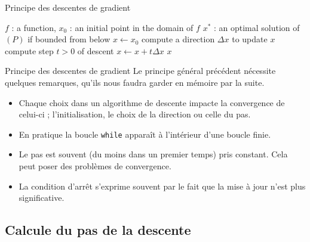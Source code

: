 \documentclass[aspectratio = 169]{beamer}
\begin{document}
\begin{frame}{Principe des descentes de gradient}
  \begin{algorithm}[H]
    \caption{Principe des descentes de gradient}
    \small{
      \begin{algorithmic}[1]
        \Statex
        \Require $f$ : a function,  $x_0$ : an initial point in the domain of $f$
        \Ensure $x^*$ : an optimal solution of $(P)$ if bounded from below
        \Statex
        \State $x \leftarrow x_0$
        \State compute a direction $\Delta x$ to update $x$
        \State compute step $t > 0$ of descent
        \State $x \leftarrow x + t\Delta x$
        \EndWhile
        \State \Return $x$
        \EndFunction
        \Statex
      \end{algorithmic}
    }
  \end{algorithm}
\end{frame}

\begin{frame}{Principe des descentes de gradient}
  Le principe général précédent nécessite quelques remarques, qu'ils
  nous faudra garder en mémoire par la suite.
  \begin{paremph}
    \begin{itemize}
    \item<2-> Chaque choix dans un algorithme de descente impacte la
      convergence de celui-ci ; l'initialisation, le choix de la
      direction ou celle du pas.
    \item<3-> En pratique la boucle \texttt{while} apparaît à
      l'intérieur d'une boucle finie.
    \item<4-> Le pas est souvent (du moins dans un premier
      temps) pris constant. Cela peut poser des problèmes de
      convergence.
    \item<5-> La condition d'arrêt s'exprime souvent par le fait que la
      mise à jour n'est plus significative.
    \end{itemize}
  \end{paremph}
\end{frame}

\subsection{Calcule du pas de la descente}
\end{document}
